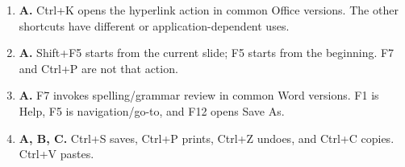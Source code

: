 \begin{enumerate}[label=\textbf{Q\arabic*.}, leftmargin=*]
\item \textbf{A.} Ctrl+K opens the hyperlink action in common Office versions. The other shortcuts have different or application-dependent uses.

\item \textbf{A.} Shift+F5 starts from the current slide; F5 starts from the beginning. F7 and Ctrl+P are not that action.

\item \textbf{A.} F7 invokes spelling/grammar review in common Word versions. F1 is Help, F5 is navigation/go-to, and F12 opens Save As.

\item \textbf{A, B, C.} Ctrl+S saves, Ctrl+P prints, Ctrl+Z undoes, and Ctrl+C copies. Ctrl+V pastes.

\end{enumerate}

